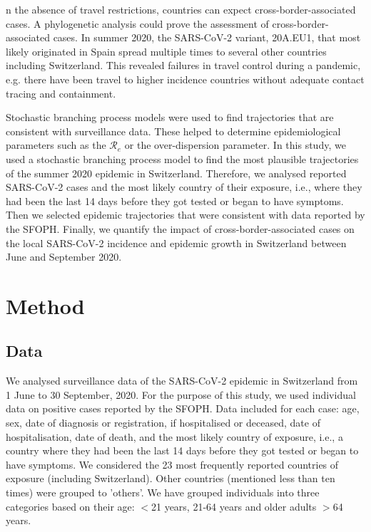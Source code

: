 \documentclass[10pt, a4paper, twoside]{article}
\begin{document}
\begin{multicols}{2}
n the absence of travel restrictions, countries can expect cross-border-associated cases.\cite{russell_effect_2021} 
A phylogenetic analysis could prove the assessment of cross-border-associated cases.\cite{hodcroft_emergence_2020}
In summer 2020, the SARS-CoV-2 variant, 20A.EU1, that most likely originated in Spain spread multiple times to several other countries including Switzerland.\cite{hodcroft_emergence_2020}
This revealed failures in travel control during a pandemic, e.g. there have been travel to higher incidence countries without adequate contact tracing and containment.\cite{hodcroft_emergence_2020}

Stochastic branching process models were used to find trajectories that are consistent with surveillance data.\cite{althaus_ebola_2015,riou_pattern_2020}
These helped to determine epidemiological parameters such as the $\mathcal{R}_e$ or the over-dispersion parameter.\cite{althaus_ebola_2015,riou_pattern_2020}
In this study, we used a stochastic branching process model to find the most plausible trajectories of the summer 2020 epidemic in Switzerland.
Therefore, we analysed reported SARS-CoV-2 cases and the most likely country of their exposure, i.e., where they had been the last 14 days before they got tested or began to have symptoms. 
Then we selected epidemic trajectories that were consistent with data reported by the SFOPH.
Finally, we quantify the impact of cross-border-associated cases on the local SARS-CoV-2 incidence and epidemic growth in Switzerland between June and September 2020. 

\section{Method}

\subsection{Data}
We analysed surveillance data of the SARS-CoV-2 epidemic in Switzerland from 1 June to 30 September, 2020. 
For the purpose of this study, we used individual data on positive cases reported by the SFOPH. 
Data included for each case: age, sex, date of diagnosis or registration, if hospitalised or deceased, date of hospitalisation, date of death, and the most likely country of exposure, i.e., a country where they had been the last 14 days before they got tested or began to have symptoms.
We considered the 23 most frequently reported countries of exposure (including Switzerland).
Other countries (mentioned less than ten times) were grouped to 'others'.
We have grouped individuals into three categories based on their age: $<$21 years, 21-64 years and older adults $>$64 years.


\end{multicols}
\end{document}
